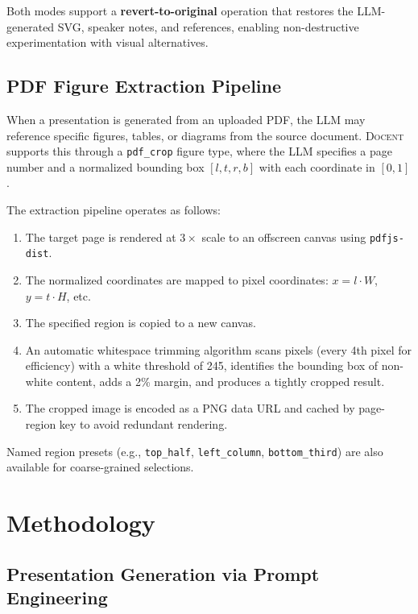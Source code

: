 \documentclass[11pt,a4paper]{article}
\newcommand{\system}{\textsc{Docent}\xspace}
\begin{document}
Both modes support a \textbf{revert-to-original} operation that restores the LLM-generated SVG, speaker notes, and references, enabling non-destructive experimentation with visual alternatives.

\subsection{PDF Figure Extraction Pipeline}
\label{sec:pdfcrop}

When a presentation is generated from an uploaded PDF, the LLM may reference specific figures, tables, or diagrams from the source document.
\system supports this through a \texttt{pdf\_crop} figure type, where the LLM specifies a page number and a normalized bounding box $[l, t, r, b]$ with each coordinate in $[0, 1]$.

The extraction pipeline operates as follows:

\begin{enumerate}[leftmargin=*,nosep]
    \item The target page is rendered at $3\times$ scale to an offscreen canvas using \texttt{pdfjs-dist}.
    \item The normalized coordinates are mapped to pixel coordinates: $x = l \cdot W$, $y = t \cdot H$, etc.
    \item The specified region is copied to a new canvas.
    \item An automatic whitespace trimming algorithm scans pixels (every 4th pixel for efficiency) with a white threshold of 245, identifies the bounding box of non-white content, adds a 2\% margin, and produces a tightly cropped result.
    \item The cropped image is encoded as a PNG data URL and cached by page-region key to avoid redundant rendering.
\end{enumerate}

Named region presets (e.g., \texttt{top\_half}, \texttt{left\_column}, \texttt{bottom\_third}) are also available for coarse-grained selections.



\section{Methodology}
\label{app:methodology}


\subsection{Presentation Generation via Prompt Engineering}
\end{document}
